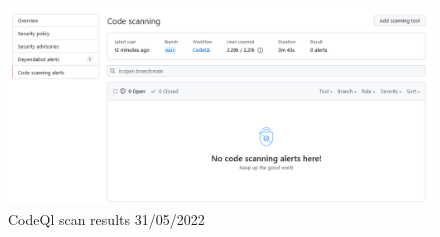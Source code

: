 \begin {figure}[H]
    \centering
    \includegraphics[scale=0.50]{images/analysis_tools/CodeQlScan.PNG}
    \caption{CodeQl scan results 31/05/2022}
    \label{fig:codeql}
\end{figure}

